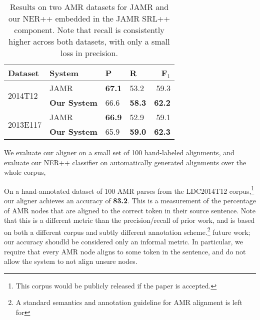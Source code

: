 \documentclass[11pt]{article}
\begin{document}

\begin{table}[t]
\begin{center}
\begin{tabular}{l|l|llr}
\textbf{Dataset} &  \textbf{System} & \textbf{P} & \textbf{R} & \textbf{F$_1$} \\
\hline
\multirow{2}{*}{2014T12} & JAMR & \textbf{67.1} & 53.2 & 59.3 \\
  & \textbf{Our System} & 66.6 & \textbf{58.3} & \textbf{62.2} \\
\hline
\multirow{2}{*}{2013E117} & JAMR & \textbf{66.9} & 52.9 & 59.1 \\
  & \textbf{Our System} & 65.9 & \textbf{59.0} & \textbf{62.3} \\
\end{tabular}
\end{center}
\caption{\label{tab:results} 
Results on two AMR datasets for JAMR and our NER++ embedded in the JAMR SRL++
  component.
Note that recall is consistently higher across both datasets, with only a small
  loss in precision.
}
\end{table}

We evaluate our aligner on a small set of 100 hand-labeled alignments,
  and evaluate our NER++ classifier on automatically generated alignments over the whole corpus,
  
On a hand-annotated dataset of 100 AMR parses from the LDC2014T12 corpus,\footnote{
    This corpus would be publicly released if the paper is accepted.
  }
  our aligner achieves
  an accuracy of \textbf{83.2}.
This is a measurement of the percentage of AMR nodes that are
  aligned to the correct token in their source sentence.
Note that this is a different metric than the precision/recall of prior work, and
  is based on both a different corpus and subtly different annotation scheme.\footnote{ 
  A standard semantics and annotation guideline for AMR alignment is left for 
}
  future work; our accuracy shoudld be considered only an informal metric.
In particular, we require that every AMR node aligns to some token in the sentence,
  and do not allow the system to not align unsure nodes.
\end{document}
